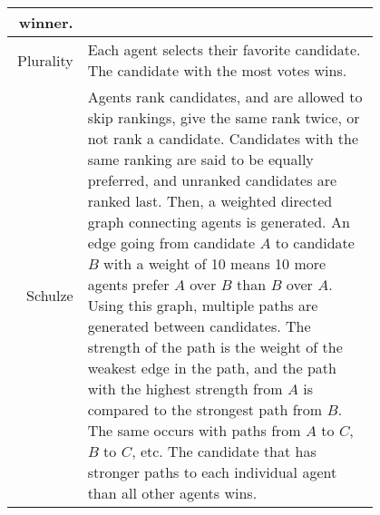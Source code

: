 \begin{tabular}{| r | p{0.80\linewidth} |}
{        winner.
    } \\
    \hline
    Plurality & {
        Each agent selects their favorite candidate.
        The candidate with the most votes wins.
    } \\
    \hline
    Schulze & {
        Agents rank candidates, and are allowed to skip rankings, give the same rank
        twice, or not rank a candidate.
        Candidates with the same ranking are said to be equally preferred, and
        unranked candidates are ranked last.
        Then, a weighted directed graph connecting agents is generated.
        An edge going from candidate $A$ to candidate $B$ with a weight of 10 means
        10 more agents prefer $A$ over $B$ than $B$ over $A$.
        Using this graph, multiple paths are generated between candidates.
        The strength of the path is the weight of the weakest edge in the path,
        and the path with the highest strength from $A$ is compared to the strongest
        path from $B$.
        The same occurs with paths from $A$ to $C$, $B$ to $C$, etc.
        The candidate that has stronger paths to each individual agent than all other
        agents wins.
    } \\
    \hline
\end{tabular}
